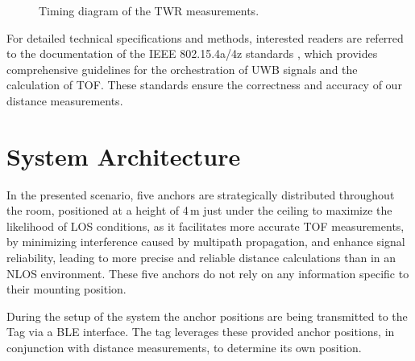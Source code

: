\documentclass[conference, a4paper]{IEEEtran}
\begin{document}
\begin{figure}
	\centering
	\caption{Timing diagram of the \ac{TWR} measurements.}
	\label{fig:csvbarchart}
\end{figure}

For detailed technical specifications and methods, interested readers are referred to the documentation of the IEEE 802.15.4a/4z standards \cite{IEEE802154a} \cite{IEEE802154z}, which provides comprehensive guidelines for the orchestration of \ac{UWB} signals and the calculation of \ac{TOF}.
These standards ensure the correctness and accuracy of our distance measurements.

\section{System Architecture}\label{section:system_arch}
In the presented scenario, five anchors are strategically distributed throughout the room,
positioned at a height of 4\,m just under the ceiling to maximize the likelihood of 
\ac{LOS} conditions, as it facilitates more accurate \ac{TOF} measurements, by minimizing interference caused by multipath propagation, and enhance signal reliability, leading to more precise and reliable distance calculations than in an \ac{NLOS} environment.
These five anchors do not rely on any information specific to their mounting position.

During the setup of the system the anchor positions are being transmitted to the Tag via a \ac{BLE} interface. 
The tag leverages these provided anchor positions, in conjunction with distance measurements, to determine its own position. 
\end{document}
